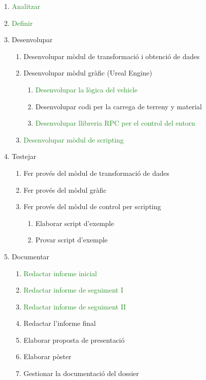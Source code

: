 \documentclass[10pt,a4paper,twocolumn,twoside]{article}
\begin{document}
\begin{enumerate}
  \item \textcolor{ForestGreen}{Analitzar}
  \item \textcolor{ForestGreen}{Definir}
  
  \item Desenvolupar
  \begin{enumerate}
    \item \textcolor{RedOrange}{Desenvolupar mòdul de transformació i obtenció de dades}
    \item Desenvolupar mòdul gràfic (Ureal Engine)
    \begin{enumerate}
	    \item \textcolor{ForestGreen}{Desenvolupar la lògica del vehicle}
    	\item \textcolor{RedOrange}{Desenvolupar codi per la carrega de terreny y material}
    	\item \textcolor{ForestGreen}{Desenvolupar llibreria RPC per el control del entorn}
  	\end{enumerate}
  	
  	\item \textcolor{ForestGreen}{Desenvolupar mòdul de scripting}
  \end{enumerate}
  
  \item Testejar
  \begin{enumerate}
    \item \textcolor{RedOrange}{Fer provés del mòdul de transformació de dades}
    \item \textcolor{RedOrange}{Fer provés del mòdul gràfic}
    \item \textcolor{RedOrange}{Fer provés del mòdul de control per scripting}
    \begin{enumerate}
    	\item \textcolor{RedOrange}{Elaborar script d'exemple}
	    \item \textcolor{RedOrange}{Provar script d'exemple}
  	\end{enumerate}
  \end{enumerate}
  
  \item Documentar
  \begin{enumerate}
    \item \textcolor{ForestGreen}{Redactar informe inicial}
    \item \textcolor{ForestGreen}{Redactar informe de seguiment I}
    \item \textcolor{ForestGreen}{Redactar informe de seguiment II}
    \item \textcolor{RedOrange}{Redactar l'informe final}
    \item Elaborar proposta de presentació
    \item Elaborar pòster
    \item \textcolor{RedOrange}{Gestionar la documentació del dossier}
  \end{enumerate}
  
\end{enumerate}
\end{document}
